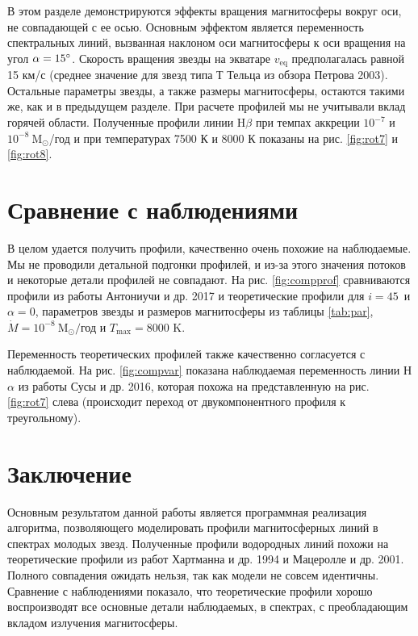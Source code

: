 \documentclass{article}
\begin{document}
В этом разделе демонстрируются эффекты вращения магнитосферы вокруг оси, не совпадающей с ее осью. Основным эффектом является переменность спектральных линий, вызванная наклоном оси магнитосферы к оси вращения на угол $\alpha = 15\text{\degree}$. Скорость вращения звезды на экватаре $v_\text{eq}$ предполагалась равной 15 км/с (среднее значение для звезд типа Т Тельца из обзора Петрова 2003). Остальные параметры звезды, а также размеры магнитосферы, остаются такими же, как и в предыдущем разделе. При расчете профилей мы не учитывали вклад горячей области. Полученные профили линии H$\beta$ при темпах аккреции $10^{-7}$ и $10^{-8}\ \text{M}_\odot$/год и при температурах 7500 К и 8000 К показаны на рис. \ref{fig:rot7} и \ref{fig:rot8}.

\FloatBarrier

\section{Сравнение с наблюдениями}

В целом удается получить профили, качественно очень похожие на наблюдаемые. Мы не проводили детальной подгонки профилей, и из-за этого значения потоков и некоторые детали профилей не совпадают. На рис. \ref{fig:compprof} сравниваются профили из работы Антониучи и др. 2017 и теоретические профили для $i = 45$\degree\ и $\alpha = 0$\degree, параметров звезды и размеров магнитосферы из таблицы \ref{tab:par}, $\dot{M} = 10^{-8}\ \text{M}_\odot/$год и $T_\text{max} = 8000$ K. 


Переменность теоретических профилей также качественно согласуется с наблюдаемой. На рис. \ref{fig:compvar} показана наблюдаемая переменность линии Н$\alpha$ из работы Сусы и др. 2016, которая похожа на представленную на рис. \ref{fig:rot7} слева (происходит переход от двукомпонентного профиля к треугольному).


\section{Заключение}

Основным результатом данной работы является программная реализация алгоритма, позволяющего моделировать профили магнитосферных линий в спектрах молодых звезд.
Полученные профили водородных линий похожи на теоретические профили из работ Хартманна и др. 1994 и Мацеролле и др. 2001. Полного совпадения ожидать нельзя, так как модели не совсем идентичны. Сравнение с наблюдениями показало, что теоретические профили хорошо воспроизводят все основные детали наблюдаемых, в спектрах, с преобладающим вкладом излучения магнитосферы. 
\end{document}

